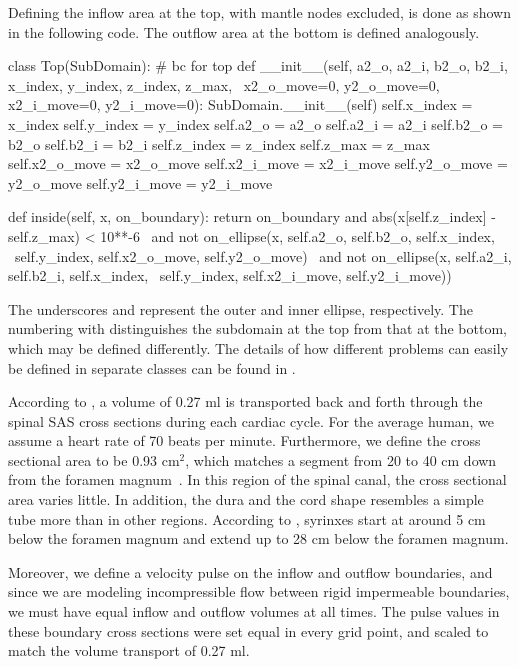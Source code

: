 Defining the inflow area at the top, with mantle nodes excluded, is
done as shown in the following code. The outflow area at the bottom is
defined analogously.

\begin{python}
class Top(SubDomain): # bc for top
    def __init__(self, a2_o, a2_i, b2_o, b2_i, x_index, y_index, z_index, z_max, \
                x2_o_move=0, y2_o_move=0, x2_i_move=0, y2_i_move=0):
    SubDomain.__init__(self)
    self.x_index = x_index
    self.y_index = y_index
    self.a2_o = a2_o
    self.a2_i = a2_i
    self.b2_o = b2_o
    self.b2_i = b2_i
    self.z_index = z_index
    self.z_max = z_max
    self.x2_o_move = x2_o_move
    self.x2_i_move = x2_i_move
    self.y2_o_move = y2_o_move
    self.y2_i_move = y2_i_move

def inside(self, x, on_boundary):
    return on_boundary and abs(x[self.z_index] - self.z_max) < 10**-6 \
           and not on_ellipse(x, self.a2_o, self.b2_o, self.x_index, \
                              self.y_index, self.x2_o_move, self.y2_o_move) \
           and not on_ellipse(x, self.a2_i, self.b2_i, self.x_index, \
                              self.y_index, self.x2_i_move, self.y2_i_move))
\end{python}

The underscores \emp{o} and \emp{i} represent the outer and inner
ellipse, respectively. The numbering with \emp{2} distinguishes the
subdomain at the top from that at the bottom, which may be defined
differently. The details of how different problems can easily be
defined in separate classes can be found in
\emp{src/mesh\_definitions/}. %

According to \citet{GuptaSoellingerBoesigerEtAl2009}, a volume of 0.27
ml is transported back and forth through the spinal SAS cross sections
during each cardiac cycle. For the average human, we assume a heart
rate of 70 beats per minute. Furthermore, we define the cross
sectional area to be 0.93 $\mathrm{cm^2}$, which matches a segment
from 20 to 40 cm down from the foramen
magnum~\citep{LothYardimciAlperin2001}. In this region of the spinal
canal, the cross sectional area varies little. In addition, the dura
and the cord shape resembles a simple tube more than in other regions.
According to \citet{OldfieldMuraszkoShawkerEtAl1994}, syrinxes start
at around 5 cm below the foramen magnum and extend up to 28 cm below
the foramen magnum.

Moreover, we define a velocity pulse on the inflow and outflow
boundaries, and since we are modeling incompressible flow between
rigid impermeable boundaries, we must have equal inflow and outflow
volumes at all times. The pulse values in these boundary cross
sections were set equal in every grid point, and scaled to match the
volume transport of 0.27 ml.

